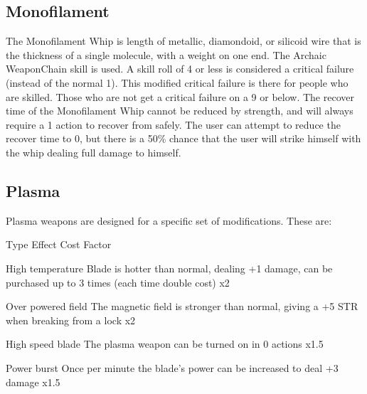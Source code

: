 \documentclass[twoside]{book}
\begin{document}
\subsection{Monofilament}
      The Monofilament Whip is length of metallic,
               diamondoid, or silicoid wire that is the thickness of a
               single molecule, with a weight on one end. The Archaic
               WeaponChain skill is used. A skill roll of 4 or
               less is considered a critical failure (instead of the
               normal 1). This modified critical failure is there for
               people who are skilled. Those who are not get a critical
               failure on a 9 or below.   The recover time of the Monofilament Whip cannot be
               reduced by strength, and will always require a 1 action to
               recover from safely. The user can attempt to reduce the
               recover time to 0, but there is a 50\% chance that the user
               will strike himself with the whip dealing full damage to
               himself. 
\subsection{Plasma}
      Plasma weapons are designed for a specific set of
               modifications. These are:   
                
                  
                   Type 
                   Effect 
                   Cost Factor   
                  
                  
                   High temperature   
                     Blade is hotter than normal, dealing +1
                     damage, can be purchased up to 3 times (each time
                     double cost) 
                   x2   
                  
                  
                   Over powered field   
                     The magnetic field is stronger than normal,
                     giving a +5 STR when breaking from a lock 
                   x2   
                  
                  
                   High speed blade   
                     The plasma weapon can be turned on in 0
                     actions 
                   x1.5   
                  
                  
                   Power burst   
                     Once per minute the blade's power can be
                     increased to deal +3 damage 
                   x1.5   
                  
\end{document}
